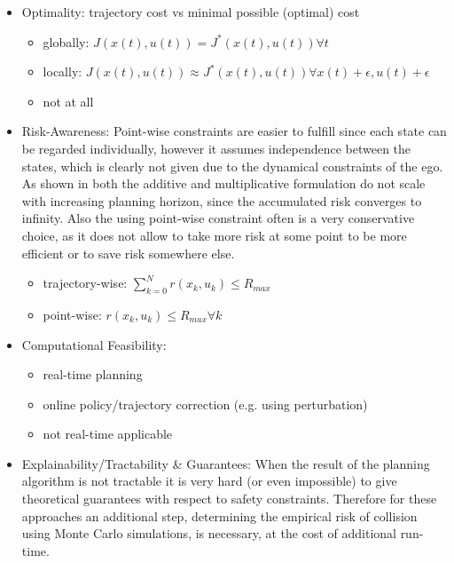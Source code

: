 \begin{itemize}
    \item Optimality: trajectory cost vs minimal possible (optimal) cost
    \begin{itemize}
        \item globally: $J(x(t), u(t)) = J^*(x(t), u(t)) \forall t$
        \item locally: $J(x(t), u(t)) \approx J^*(x(t), u(t)) \forall x(t) + \epsilon, u(t) + \epsilon $
        \item not at all
    \end{itemize}
    
    \item Risk-Awareness: Point-wise constraints are easier to fulfill since each state can be regarded individually, however it assumes independence between the states, which is clearly not given due to the dynamical constraints of the ego. As shown in \cite{JansonSP15} both the additive and multiplicative formulation do not scale with increasing planning horizon, since the accumulated risk converges to infinity. Also the using point-wise constraint often is a very conservative choice, as it does not allow to take more risk at some point to be more efficient or to save risk somewhere else. 
    \begin{itemize}
        \item trajectory-wise: $\sum_{k = 0}^N r(x_k, u_k) \leq R_{max}$
        \item point-wise: $r(x_k, u_k) \leq R_{max} \forall k$
    \end{itemize}

    \item Computational Feasibility:  
    \begin{itemize}
        \item real-time planning
        \item online policy/trajectory correction (e.g. using perturbation) 
        \item not real-time applicable
    \end{itemize}
    
    \item Explainability/Tractability \& Guarantees: When the result of the planning algorithm is not tractable it is very hard (or even impossible) to give theoretical guarantees with respect to safety constraints. Therefore for these approaches an additional step, determining the empirical risk of collision using Monte Carlo simulations, is necessary, at the cost of additional run-time.  
\end{itemize}

